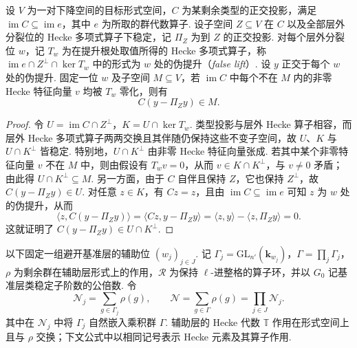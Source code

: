 \begin{lemma}[正交于伪提升时的类型投影]
\label{lem:c-type-projection-false}
\emitthmsource
设 $V$ 为一对下降空间的目标形式空间，$C$ 为某剩余类型的正交投影，满足 $\operatorname{im}C\subseteq\operatorname{im}e$，其中 $e$ 为所取的群代数算子.
设子空间 $Z\subseteq V$ 在 $C$ 以及全部层外分裂位的 Hecke 多项式算子下稳定，记 $\Pi_Z$ 为到 $Z$ 的正交投影.
对每个层外分裂位 $w$，记 $T_w$ 为在提升根处取值所得的 Hecke 多项式算子，称 $\operatorname{im}e\cap Z^\perp\cap\ker T_w$ 中的形式为 $w$ 处的伪提升（\emph{false lift}）.
设 $y$ 正交于每个 $w$ 处的伪提升. 固定一位 $w$ 及子空间 $M\subseteq V$，若 $\operatorname{im}C$ 中每个不在 $M$ 内的非零 Hecke 特征向量 $v$ 均被 $T_w$ 零化，则有
\[
 C(y-\Pi_Zy)\in M .
\]
\end{lemma}
\begin{proof}
令 $U=\operatorname{im}C\cap Z^\perp$，$K=U\cap\ker T_w$.
类型投影与层外 Hecke 算子相容，而层外 Hecke 多项式算子两两交换且其伴随仍保持这些不变子空间，故 $U$、$K$ 与 $U\cap K^\perp$ 皆稳定.
特别地，$U\cap K^\perp$ 由非零 Hecke 特征向量张成.
若其中某个非零特征向量 $v$ 不在 $M$ 中，则由假设有 $T_wv=0$，从而 $v\in K\cap K^\perp$，与 $v\ne0$ 矛盾；由此得 $U\cap K^\perp\subseteq M$.
另一方面，由于 $C$ 自伴且保持 $Z$，它也保持 $Z^\perp$，故 $C(y-\Pi_Zy)\in U$. 对任意 $z\in K$，有 $Cz=z$，且由 $\operatorname{im}C\subseteq\operatorname{im}e$ 可知 $z$ 为 $w$ 处的伪提升，从而
\[
 \langle z,C(y-\Pi_Zy)\rangle
  =\langle Cz,y-\Pi_Zy\rangle
  =\langle z,y\rangle-\langle z,\Pi_Zy\rangle=0 .
\]
这就证明了 $C(y-\Pi_Zy)\in U\cap K^\perp$.
\end{proof}

以下固定一组避开基准层的辅助位 $(w_j)_{j\in J}$.
记 $\Gamma_j=\mathrm{GL}_{n'}(\mathbf k_{w_j})$，$\Gamma=\prod_j\Gamma_j$，$\rho$ 为剩余群在辅助层形式上的作用，$\mathcal R$ 为保持 $\ell$-进整格的算子环，并以 $G_0$ 记基准层类稳定子阶数的公倍数. 令
\[
 \mathcal N_j=\sum_{g\in\Gamma_j}\rho(g),\qquad
 \mathcal N=\sum_{g\in\Gamma}\rho(g)=\prod_{j\in J}\mathcal N_j .
\]
其中在 $\mathcal N_j$ 中将 $\Gamma_j$ 自然嵌入乘积群 $\Gamma$. 辅助层的 Hecke 代数 $\mathbb T$ 作用在形式空间上且与 $\rho$ 交换；下文公式中以相同记号表示 Hecke 元素及其算子作用.

